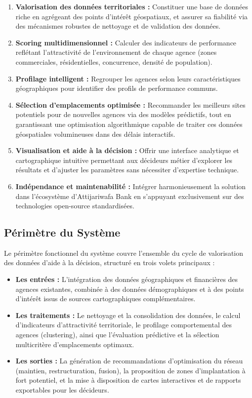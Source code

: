 \documentclass[11pt,a4paper,twoside]{report}
\begin{document}
\begin{enumerate}[leftmargin=1.2cm]
    \item \textbf{Valorisation des données territoriales :} Constituer une base de données riche en agrégeant des points d'intérêt géospatiaux, et assurer sa fiabilité via des mécanismes robustes de nettoyage et de validation des données.
    \item \textbf{Scoring multidimensionnel :} Calculer des indicateurs de performance reflétant l'attractivité de l'environnement de chaque agence (zones commerciales, résidentielles, concurrence, densité de population).
    \item \textbf{Profilage intelligent :} Regrouper les agences selon leurs caractéristiques géographiques pour identifier des profils de performance communs.
    \item \textbf{Sélection d'emplacements optimisée :} Recommander les meilleurs sites potentiels pour de nouvelles agences via des modèles prédictifs, tout en garantissant une optimisation algorithmique capable de traiter ces données géospatiales volumineuses dans des délais interactifs.
    \item \textbf{Visualisation et aide à la décision :} Offrir une interface analytique et cartographique intuitive permettant aux décideurs métier d'explorer les résultats et d'ajuster les paramètres sans nécessiter d'expertise technique.
    \item \textbf{Indépendance et maintenabilité :} Intégrer harmonieusement la solution dans l'écosystème d'Attijariwafa Bank en s'appuyant exclusivement sur des technologies open-source standardisées.
\end{enumerate}

\subsection{Périmètre du Système}

Le périmètre fonctionnel du système couvre l'ensemble du cycle de valorisation des données d'aide à la décision, structuré en trois volets principaux :

\begin{itemize}[leftmargin=1.2cm]
    \item \textbf{Les entrées :} L'intégration des données géographiques et financières des agences existantes, combinée à des données démographiques et à des points d'intérêt issus de sources cartographiques complémentaires.
    \item \textbf{Les traitements :} Le nettoyage et la consolidation des données, le calcul d'indicateurs d'attractivité territoriale, le profilage comportemental des agences (clustering), ainsi que l'évaluation prédictive et la sélection multicritère d'emplacements optimaux.
    \item \textbf{Les sorties :} La génération de recommandations d'optimisation du réseau (maintien, restructuration, fusion), la proposition de zones d'implantation à fort potentiel, et la mise à disposition de cartes interactives et de rapports exportables pour les décideurs.
\end{itemize}
\end{document}
